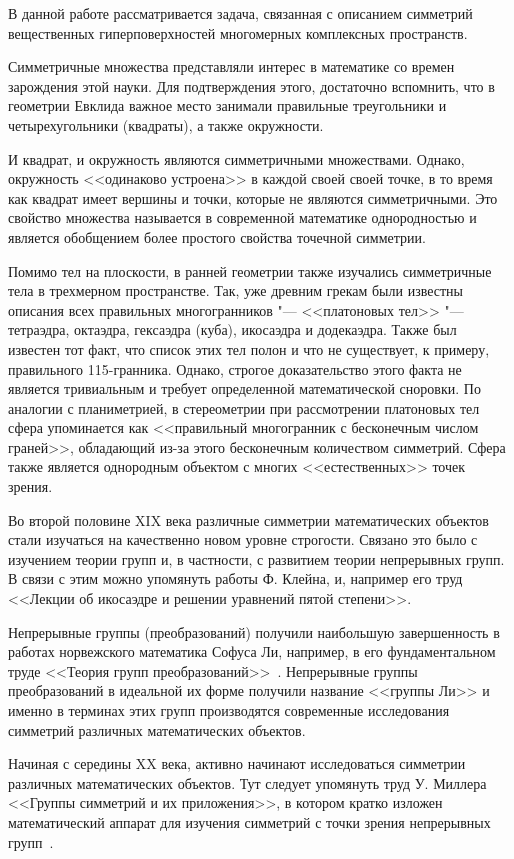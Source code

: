 \documentclass[../main.tex]{subfiles}
\begin{document}
В данной работе рассматривается задача, связанная с описанием симметрий вещественных гиперповерхностей многомерных комплексных пространств.

Симметричные множества представляли интерес в математике со времен зарождения этой науки. Для подтверждения этого, достаточно вспомнить, что в геометрии Евклида важное место занимали правильные треугольники и четырехугольники (квадраты), а также окружности.

И квадрат, и окружность являются симметричными множествами. Однако, окружность <<одинаково устроена>> в каждой своей своей точке, в то время как квадрат имеет вершины и точки, которые не являются симметричными. Это свойство множества называется в современной математике однородностью и является обобщением более простого свойства точечной симметрии.

Помимо тел на плоскости, в ранней геометрии также изучались симметричные тела в трехмерном пространстве. Так, уже древним грекам были известны описания всех правильных многогранников "--- <<платоновых тел>> "--- тетраэдра, октаэдра, гексаэдра (куба), икосаэдра и додекаэдра. Также был известен тот факт, что список этих тел полон и что не существует, к примеру, правильного 115-гранника. Однако, строгое доказательство этого факта не является тривиальным и требует определенной математической сноровки. По аналогии с планиметрией, в стереометрии при рассмотрении платоновых тел сфера упоминается как <<правильный многогранник с бесконечным числом граней>>, обладающий из-за этого бесконечным количеством симметрий. Сфера также является однородным объектом с многих <<естественных>> точек зрения.

Во второй половине XIX века различные симметрии математических объектов стали изучаться на качественно новом уровне строгости. Связано это было с изучением теории групп и, в частности, с развитием теории непрерывных групп. В связи с этим можно упомянуть работы Ф. Клейна, и, например его труд <<Лекции об икосаэдре и решении уравнений пятой степени>>.

Непрерывные группы (преобразований) получили наибольшую завершенность в работах норвежского математика Софуса Ли, например, в его фундаментальном труде <<Теория групп преобразований>>~\cite{lie}. Непрерывные группы преобразований в идеальной их форме получили название <<группы Ли>> и именно в терминах этих групп производятся современные исследования симметрий различных математических объектов.

Начиная с середины XX века, активно начинают исследоваться симметрии различных математических объектов. Тут следует упомянуть труд У. Миллера <<Группы симметрий и их приложения>>, в котором кратко изложен математический аппарат для изучения симметрий с точки зрения непрерывных групп~\cite{miller1973symmetry}.
\end{document}
